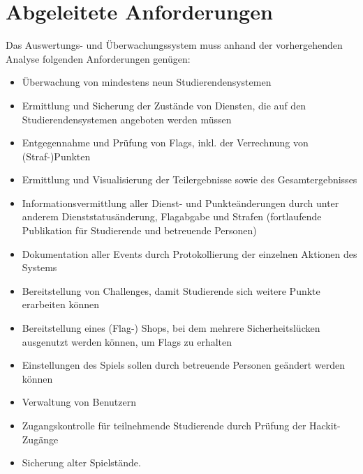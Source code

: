 \section{Abgeleitete Anforderungen}
\label{sec:Abgeleitete_Anforderungen}

Das Auswertungs- und Überwachungssystem muss anhand der vorhergehenden Analyse folgenden Anforderungen genügen:
\begin{itemize}
	\item Überwachung von mindestens neun Studierendensystemen
	\item Ermittlung und Sicherung der Zustände von Diensten, die auf den Studierendensystemen angeboten werden müssen
	\item Entgegennahme und Prüfung von Flags, inkl. der Verrechnung von (Straf-)Punkten
	\item Ermittlung und Visualisierung der Teilergebnisse sowie des Gesamtergebnisses
	\item Informationsvermittlung aller Dienst- und Punkteänderungen durch unter anderem \linebreak Dienststatusänderung, Flagabgabe und Strafen (fortlaufende Publikation für Studierende und betreuende Personen)
	\item Dokumentation aller Events durch Protokollierung der einzelnen Aktionen des Systems
	\item Bereitstellung von Challenges, damit Studierende sich weitere Punkte erarbeiten können
	\item Bereitstellung eines (Flag-) Shops, bei dem mehrere Sicherheitslücken ausgenutzt werden können, um Flags zu erhalten
	\item Einstellungen des Spiels sollen durch betreuende Personen geändert werden können
	\item Verwaltung von Benutzern
	\item Zugangskontrolle für teilnehmende Studierende durch Prüfung der Hackit-Zugänge
	\item Sicherung alter Spielstände.
\end{itemize}